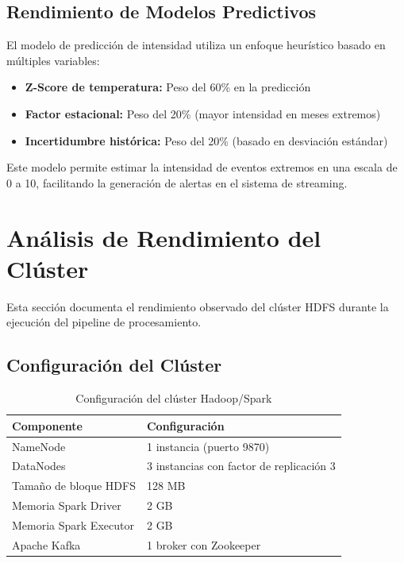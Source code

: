 \documentclass[12pt,a4paper]{scrartcl}
\begin{document}
\subsection{Rendimiento de Modelos Predictivos}

El modelo de predicción de intensidad utiliza un enfoque heurístico basado en múltiples variables:

\begin{itemize}
    \item \textbf{Z-Score de temperatura:} Peso del 60\% en la predicción
    \item \textbf{Factor estacional:} Peso del 20\% (mayor intensidad en meses extremos)
    \item \textbf{Incertidumbre histórica:} Peso del 20\% (basado en desviación estándar)
\end{itemize}

Este modelo permite estimar la intensidad de eventos extremos en una escala de 0 a 10, facilitando la generación de alertas en el sistema de streaming.


\section{Análisis de Rendimiento del Clúster}

Esta sección documenta el rendimiento observado del clúster HDFS durante la ejecución del pipeline de procesamiento.

\subsection{Configuración del Clúster}

\begin{table}[h]
\centering
\begin{tabular}{@{}ll@{}}
\toprule
\textbf{Componente} & \textbf{Configuración} \\
\midrule
NameNode & 1 instancia (puerto 9870) \\
DataNodes & 3 instancias con factor de replicación 3 \\
Tamaño de bloque HDFS & 128 MB \\
Memoria Spark Driver & 2 GB \\
Memoria Spark Executor & 2 GB \\
Apache Kafka & 1 broker con Zookeeper \\
\bottomrule
\end{tabular}
\caption{Configuración del clúster Hadoop/Spark}
\end{table}
\end{document}
